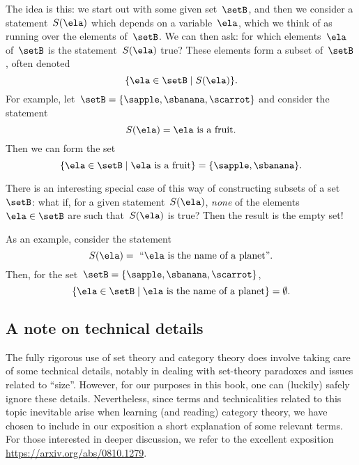 The idea is this: we start out with some given set~$\setB$, and then we consider a statement~$S(\ela)$ which depends on a variable~$\ela$, which we think of as running over the elements of~$\setB$.
We can then ask: for which elements~$\ela$ of~$\setB$ is the statement~$S(\ela)$ true?
These elements form a subset of~$\setB$, often denoted
%
\begin{equation}
    \label{eq:axiom-specialization}
    \{ \ela \in \setB \mid S(\ela) \}.
\end{equation}
%
For example, let~$\setB = \{ \sapple, \sbanana, \scarrot \}$ and consider the statement
%
\begin{equation*}
    S(\ela) =  \ela \text{ is a fruit}.
\end{equation*}
%
Then we can form the set
%
\begin{equation*}
    \{ \ela \in \setB \mid \ela \text{ is a fruit} \} = \{ \sapple, \sbanana \}.
\end{equation*}

There is an interesting special case of this way of constructing subsets of a set~$\setB$:
what if, for a given statement~$S(\ela)$, \emph{none} of the elements~$\ela \in \setB$ are such that~$S(\ela)$ is true?
Then the result is the empty set!

As an example, consider the statement
%
\begin{equation*}
    S(\ela) =\text{ ``} \ela \text{ is the name of a planet''}.
\end{equation*}
%
Then, for the set~$\setB = \{ \sapple, \sbanana, \scarrot \}$,
\begin{equation*}
    \{ \ela \in \setB \mid \ela \text{ is the name of a planet} \} = \emptyset.
\end{equation*}




\subsection{A note on technical details}

The fully rigorous use of set theory and category theory does involve taking care of some technical details, notably in dealing with set-theory paradoxes and issues related to ``size''.
However, for our purposes in this book, one can (luckily) safely ignore these details.
Nevertheless, since terms and technicalities related to this topic inevitable arise when learning (and reading) category theory, we have chosen to include in our exposition a short explanation of some relevant terms.
For those interested in deeper discussion, we refer to the excellent exposition \url{https://arxiv.org/abs/0810.1279}.


